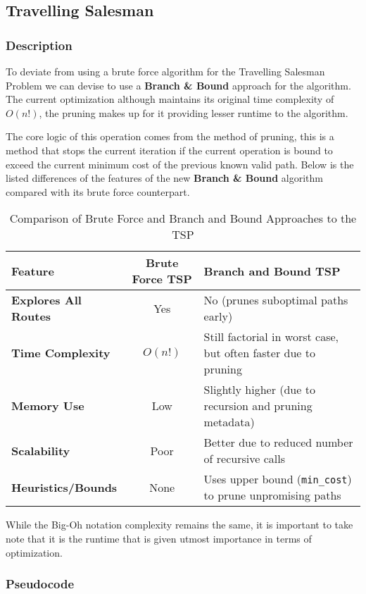 \subsection{Travelling Salesman}
\subsubsection{Description}
To deviate from using a brute force algorithm for the Travelling Salesman Problem we can devise to use a \textbf{Branch \& Bound} approach for the algorithm. The current optimization although maintains its original time complexity of $O(n!)$, the pruning makes up for it providing lesser runtime to the algorithm.

The core logic of this operation comes from the method of pruning, this is a method that stops the current iteration if the current operation is bound to exceed the current minimum cost of the previous known valid path. Below is the listed differences of the features of the new \textbf{Branch \& Bound} algorithm compared with its brute force counterpart.

\begin{table}[H]
    \centering
    \begin{tabular}{| l | c | p{8cm} |}
    \hline
    \textbf{Feature} & \textbf{Brute Force TSP} & \textbf{Branch and Bound TSP} \\
    \hline
    \textbf{Explores All Routes} & Yes & No (prunes suboptimal paths early) \\
    \hline
    \textbf{Time Complexity} & $O(n!)$ & Still factorial in worst case, but often faster due to pruning \\
    \hline
    \textbf{Memory Use} & Low & Slightly higher (due to recursion and pruning metadata) \\
    \hline
    \textbf{Scalability} & Poor & Better due to reduced number of recursive calls \\
    \hline
    \textbf{Heuristics/Bounds} & None & Uses upper bound (\texttt{min\_cost}) to prune unpromising paths \\
    \hline
    \end{tabular}
    \caption{Comparison of Brute Force and Branch and Bound Approaches to the TSP}
\end{table}

While the Big-Oh notation complexity remains the same, it is important to take note that it is the runtime that is given utmost importance in terms of optimization.
\subsubsection{Pseudocode}

